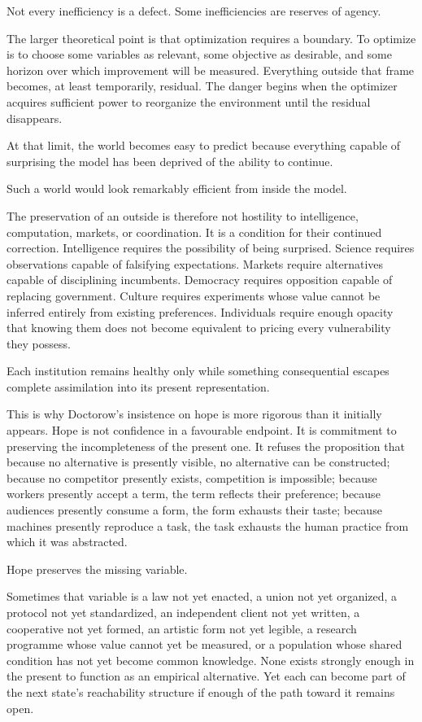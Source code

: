 \documentclass[11pt]{article}
\begin{document}
Not every inefficiency is a defect. Some inefficiencies are reserves of agency.

The larger theoretical point is that optimization requires a boundary. To optimize is to choose some variables as relevant, some objective as desirable, and some horizon over which improvement will be measured. Everything outside that frame becomes, at least temporarily, residual. The danger begins when the optimizer acquires sufficient power to reorganize the environment until the residual disappears.

At that limit, the world becomes easy to predict because everything capable of surprising the model has been deprived of the ability to continue.

Such a world would look remarkably efficient from inside the model.

The preservation of an outside is therefore not hostility to intelligence, computation, markets, or coordination. It is a condition for their continued correction. Intelligence requires the possibility of being surprised. Science requires observations capable of falsifying expectations. Markets require alternatives capable of disciplining incumbents. Democracy requires opposition capable of replacing government. Culture requires experiments whose value cannot be inferred entirely from existing preferences. Individuals require enough opacity that knowing them does not become equivalent to pricing every vulnerability they possess.

Each institution remains healthy only while something consequential escapes complete assimilation into its present representation.

This is why Doctorow's insistence on hope is more rigorous than it initially appears. Hope is not confidence in a favourable endpoint. It is commitment to preserving the incompleteness of the present one. It refuses the proposition that because no alternative is presently visible, no alternative can be constructed; because no competitor presently exists, competition is impossible; because workers presently accept a term, the term reflects their preference; because audiences presently consume a form, the form exhausts their taste; because machines presently reproduce a task, the task exhausts the human practice from which it was abstracted.

Hope preserves the missing variable.

Sometimes that variable is a law not yet enacted, a union not yet organized, a protocol not yet standardized, an independent client not yet written, a cooperative not yet formed, an artistic form not yet legible, a research programme whose value cannot yet be measured, or a population whose shared condition has not yet become common knowledge. None exists strongly enough in the present to function as an empirical alternative. Yet each can become part of the next state's reachability structure if enough of the path toward it remains open.
\end{document}
